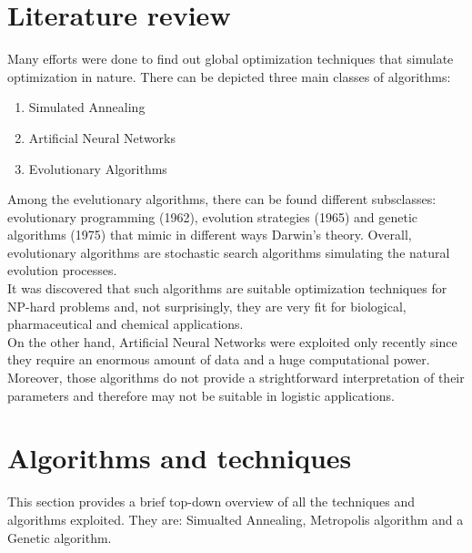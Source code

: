 \documentclass{article}
\begin{document}
\section{Literature review}
Many efforts were done to find out global optimization techniques that simulate optimization in nature. There can be depicted three main classes of algorithms:
\begin{enumerate}
\item Simulated Annealing
\item Artificial Neural Networks
\item Evolutionary Algorithms
\end{enumerate}
Among the evelutionary algorithms, there can be found different subsclasses: evolutionary programming (1962), evolution strategies (1965) and genetic algorithms (1975) that mimic in different ways Darwin's theory.  Overall, evolutionary algorithms are stochastic search algorithms simulating the natural evolution processes. \cite{gareview}\\
It was discovered that such algorithms are suitable optimization techniques for NP-hard problems and, not surprisingly, they are very fit for biological, pharmaceutical and chemical applications. \\
On the other hand, Artificial Neural Networks were exploited only recently since they require an enormous amount of data and a huge computational power. \cite{annreview} \\
Moreover, those algorithms do not provide a strightforward interpretation of their parameters and therefore may not be suitable in logistic applications.

\section{Algorithms and techniques} \label{algorithms}
This section provides a brief top-down overview of all the techniques and algorithms exploited. They are: Simualted Annealing, Metropolis algorithm and a Genetic algorithm.
\end{document}
